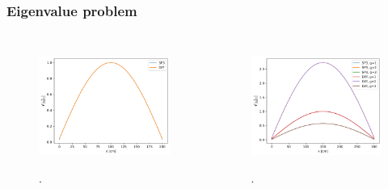 \begin{frame}
\frametitle{Eigenvalue problem}
\begin{columns}
    \column[t]{5cm}
	\begin{figure}[htbp!]
		\begin{center}
			\includegraphics[height=4cm]{../output-1g-crit}
		\end{center}
		\caption{.}
	\end{figure}

	\column[t]{5cm}
	\begin{figure}[htbp!]
		\begin{center}
			\includegraphics[height=4cm]{../output-3g-crit}
		\end{center}
		\caption{.}
	\end{figure}
\end{columns}
\end{frame}





